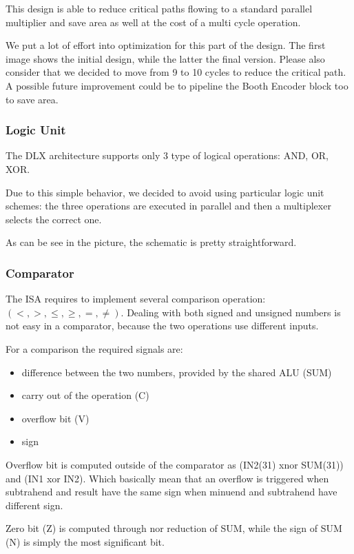 \documentclass[12pt]{article}
\begin{document}
This design is able to reduce critical paths flowing to a standard parallel multiplier and save area as well at the cost of a multi cycle operation. 

We put a lot of effort into optimization for this part of the design. The first image shows the initial design, while the latter the final version. Please also consider that we decided to move from 9 to 10 cycles to reduce the critical path.
A possible future improvement could be to pipeline the Booth Encoder block too to save area. 

\subsubsection{Logic Unit}
The DLX architecture supports only 3 type of logical operations: AND, OR, XOR. 

Due to this simple behavior, we decided to avoid using particular logic unit schemes: the three operations are executed in parallel and then a multiplexer selects the correct one. 

As can be see in the picture, the schematic is pretty straightforward.


\subsubsection{Comparator}
The ISA requires to implement several comparison operation: $(<, >, \leq, \geq, =, \neq)$.
Dealing with both signed and unsigned numbers is not easy in a comparator, because the two operations use different inputs.

For a comparison the required signals are:
\begin{itemize}
	\item difference between the two numbers, provided by the shared ALU (SUM)
	\item carry out of the operation (C)
	\item overflow bit (V)
	\item sign
\end{itemize}
Overflow bit is computed outside of the comparator as (IN2(31) xnor SUM(31)) and (IN1 xor IN2).
Which basically mean that an overflow is triggered when subtrahend and result have the same sign when minuend and subtrahend have different sign.

Zero bit (Z) is computed through nor reduction of SUM, while the sign of SUM (N) is simply the most significant bit.
\end{document}
